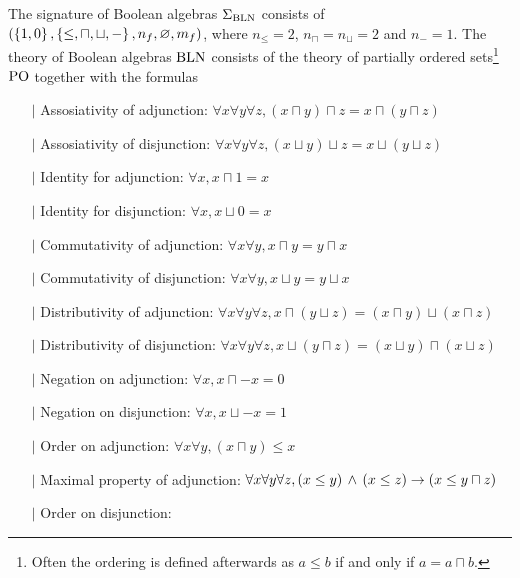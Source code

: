 \begin{dfn}
    The signature of Boolean algebras $\Sigma_{\mathrm{BLN}}$ consists of 
    $(\left\{1,0\right\},\left\{\leq,\sqcap,\sqcup,-\right\},n_f,\varnothing,m_f)$,
    where $n_\leq = 2$, $n_\sqcap = n_\sqcup = 2$ and $n_- = 1$.
    The theory of Boolean algebras $\mathrm{BLN}$ consists of the theory of 
    partially ordered sets\footnote{Often 
        the ordering is defined afterwards as 
        $a \leq b$ if and only if $a = a \sqcap b$.} 
    $\mathrm{PO}$ together with the formulas
    \begin{itemize}
        \item[$\vert$] Assosiativity of adjunction: 
            $\forall x \forall y \forall z, 
            (x \sqcap y) \sqcap z = x \sqcap (y \sqcap z)$
        \item[$\vert$] Assosiativity of disjunction: 
            $\forall x \forall y \forall z, 
            (x \sqcup y) \sqcup z = x \sqcup (y \sqcup z)$
        \item[$\vert$] Identity for adjunction:
            $\forall x, x \sqcap 1 = x$ 
        \item[$\vert$] Identity for disjunction:
            $\forall x, x \sqcup 0 = x$ 
        \item[$\vert$] Commutativity of adjunction: 
            $\forall x \forall y, x \sqcap y = y \sqcap x$
        \item[$\vert$] Commutativity of disjunction: 
            $\forall x \forall y, x \sqcup y = y \sqcup x$
        \item[$\vert$] Distributivity of adjunction:
            $\forall x \forall y \forall z, 
            x \sqcap (y \sqcup z) = (x \sqcap y) \sqcup (x \sqcap z)$
        \item[$\vert$] Distributivity of disjunction:
            $\forall x \forall y \forall z, 
            x \sqcup (y \sqcap z) = (x \sqcup y) \sqcap (x \sqcup z)$
        \item[$\vert$] Negation on adjunction: 
            $\forall x, x \sqcap - x = 0$ 
        \item[$\vert$] Negation on disjunction: 
            $\forall x, x \sqcup - x = 1$ 
        \item[$\vert$] Order on adjunction:
            $\forall x \forall y, (x \sqcap y) \leq x$
        \item[$\vert$] Maximal property of adjunction:
            $\forall x \forall y \forall z, 
            (x \leq y) \, \land \, (x \leq z) \to (x \leq y \sqcap z)$ 
        \item[$\vert$] Order on disjunction:

\end{itemize}
\end{dfn}
